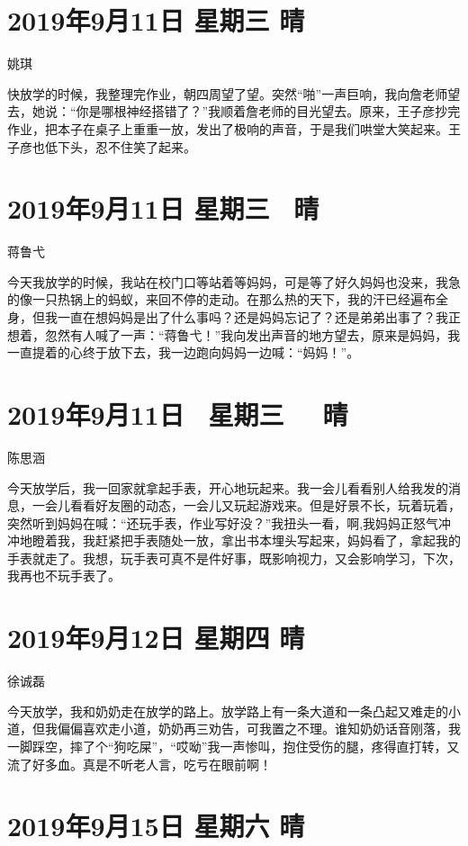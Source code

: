 \section{2019年9月11日 星期三 晴}

姚琪

快放学的时候，我整理完作业，朝四周望了望。突然``啪''一声巨响，我向詹老师望去，她说：``你是哪根神经搭错了？''我顺着詹老师的目光望去。原来，王子彦抄完作业，把本子在桌子上重重一放，发出了极响的声音，于是我们哄堂大笑起来。王子彦也低下头，忍不住笑了起来。

\section{2019年9月11日 星期三~ 晴}

蒋鲁弋

今天我放学的时候，我站在校门口等站着等妈妈，可是等了好久妈妈也没来，我急的像一只热锅上的蚂蚁，来回不停的走动。在那么热的天下，我的汗已经遍布全身，但我一直在想妈妈是出了什么事吗？还是妈妈忘记了？还是弟弟出事了？我正想着，忽然有人喊了一声：``蒋鲁弋！''我向发出声音的地方望去，原来是妈妈，我一直提着的心终于放下去，我一边跑向妈妈一边喊：``妈妈！''。

\section{2019年9月11日~ 星期三~~ 晴}

陈思涵

今天放学后，我一回家就拿起手表，开心地玩起来。我一会儿看看别人给我发的消息，一会儿看看好友圈的动态，一会儿又玩起游戏来。但是好景不长，玩着玩着，突然听到妈妈在喊：``还玩手表，作业写好没？''我扭头一看，啊,我妈妈正怒气冲冲地瞪着我，我赶紧把手表随处一放，拿出书本埋头写起来，妈妈看了，拿起我的手表就走了。我想，玩手表可真不是件好事，既影响视力，又会影响学习，下次，我再也不玩手表了。

\section{2019年9月12日 星期四 晴}

徐诚磊

今天放学，我和奶奶走在放学的路上。放学路上有一条大道和一条凸起又难走的小道，但我偏偏喜欢走小道，奶奶再三劝告，可我置之不理。谁知奶奶话音刚落，我一脚踩空，摔了个``狗吃屎''，``哎呦''我一声惨叫，抱住受伤的腿，疼得直打转，又流了好多血。真是不听老人言，吃亏在眼前啊！

\section{2019年9月15日 星期六 晴}

